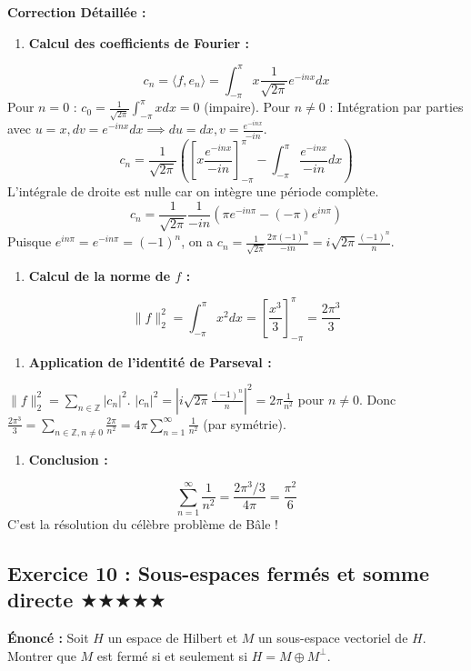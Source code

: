 \documentclass[11pt,a4paper]{article}
\begin{document}
\textbf{Correction Détaillée :}
\begin{enumerate}
\item \textbf{Calcul des coefficients de Fourier :}
\end{enumerate}
   $$ c_n = \langle f, e_n \rangle = \int_{-\pi}^\pi x \frac{1}{\sqrt{2\pi}} e^{-inx} dx $$
   Pour $n=0$ : $c_0 = \frac{1}{\sqrt{2\pi}} \int_{-\pi}^\pi x dx = 0$ (impaire).
   Pour $n \ne 0$ : Intégration par parties avec $u=x, dv=e^{-inx}dx \implies du=dx, v=\frac{e^{-inx}}{-in}$.
   $$ c_n = \frac{1}{\sqrt{2\pi}} \left( \left[ x \frac{e^{-inx}}{-in} \right]_{-\pi}^\pi - \int_{-\pi}^\pi \frac{e^{-inx}}{-in} dx \right) $$
   L'intégrale de droite est nulle car on intègre une période complète.
   $$ c_n = \frac{1}{\sqrt{2\pi}} \frac{1}{-in} ( \pi e^{-in\pi} - (-\pi) e^{in\pi} ) $$
   Puisque $e^{in\pi} = e^{-in\pi} = (-1)^n$, on a $c_n = \frac{1}{\sqrt{2\pi}} \frac{2\pi (-1)^n}{-in} = i \sqrt{2\pi} \frac{(-1)^n}{n}$.
\begin{enumerate}
\item \textbf{Calcul de la norme de $f$ :}
\end{enumerate}
   $$ \|f\|_2^2 = \int_{-\pi}^\pi x^2 dx = \left[ \frac{x^3}{3} \right]_{-\pi}^\pi = \frac{2\pi^3}{3} $$
\begin{enumerate}
\item \textbf{Application de l'identité de Parseval :}
\end{enumerate}
   $\|f\|_2^2 = \sum_{n \in \mathbb{Z}} |c_n|^2$.
   $|c_n|^2 = \left| i \sqrt{2\pi} \frac{(-1)^n}{n} \right|^2 = 2\pi \frac{1}{n^2}$ pour $n \ne 0$.
   Donc $\frac{2\pi^3}{3} = \sum_{n \in \mathbb{Z}, n \ne 0} \frac{2\pi}{n^2} = 4\pi \sum_{n=1}^\infty \frac{1}{n^2}$ (par symétrie).
\begin{enumerate}
\item \textbf{Conclusion :}
\end{enumerate}
   $$ \sum_{n=1}^\infty \frac{1}{n^2} = \frac{2\pi^3 / 3}{4\pi} = \frac{\pi^2}{6} $$
   C'est la résolution du célèbre problème de Bâle !



\subsection*{Exercice 10 : Sous-espaces fermés et somme directe \quad $\bigstar\bigstar\bigstar\bigstar\bigstar$}

\textbf{Énoncé :}
Soit $H$ un espace de Hilbert et $M$ un sous-espace vectoriel de $H$. Montrer que $M$ est fermé si et seulement si $H = M \oplus M^\perp$.
\end{document}
